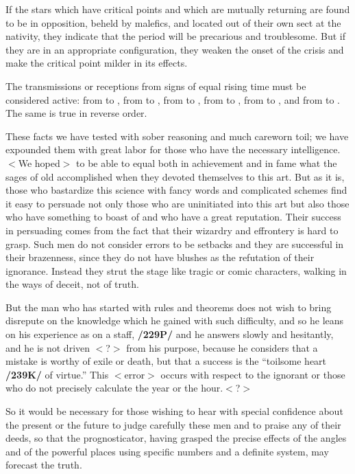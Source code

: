 If the stars which have critical points and which are mutually returning are found to be in opposition, beheld by malefics, and located out
of their own sect at the nativity, they indicate that the period will be precarious and troublesome. But if they are in an appropriate configuration, they weaken the onset of the crisis and make the critical point milder in its effects. 

The transmissions or receptions from signs of equal rising time must be considered active: from \Aries\xspace to \Pisces, from \Taurus\xspace to \Aquarius, from \Gemini\xspace to \Capricorn, from \Cancer\xspace to \Sagittarius, from \Leo\xspace to \Scorpio, and from \Virgo\xspace to \Libra. The same is true in reverse order.

These facts we have tested with sober reasoning and much careworn toil; we have expounded them with great labor for those who have the necessary intelligence. $<$We hoped$>$ to be able to equal both in
achievement and in fame what the sages of old accomplished when they devoted themselves to this art. But as it is, those who bastardize this science with fancy words and complicated schemes find it easy to
persuade not only those who are uninitiated into this art but also those who have something to boast of and who have a great reputation. Their success in persuading comes from the fact that their wizardry and effrontery is hard to grasp. Such men do not consider errors to be setbacks and they are successful in their brazenness, since they do not have blushes as the refutation of their ignorance. Instead they strut the stage like tragic or comic characters, walking in the ways of deceit, not of truth. 

But the man who has started with rules and theorems does not wish to bring disrepute on the knowledge which he gained with such difficulty, and so he leans on his experience as on a staff, \textbf{/229P/} and he answers slowly and hesitantly, and he is not driven $<$?$>$ from his purpose, because he considers that a mistake is worthy of exile or death, but that a success is the “toilsome heart \textbf{/239K/} of virtue.” This $<$error$>$ occurs with respect to the ignorant or those who do not precisely calculate the year or the hour.$<$?$>$

So it would be necessary for those wishing to hear with special confidence about the present or the future to judge carefully these men and to praise any of their deeds, so that the prognosticator, having grasped the precise effects of the angles and of the powerful places using specific numbers and a definite system, may forecast the truth.

